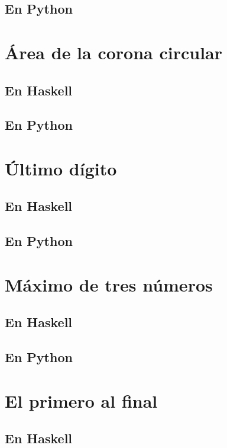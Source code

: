 \documentclass[a4paper,12pt,twoside]{book}
\begin{document}
\subsection*{En Python}

\section{Área de la corona circular}
\subsection*{En Haskell}
\subsection*{En Python}

\section{Último dígito}
\subsection*{En Haskell}
\subsection*{En Python}

\section{Máximo de tres números}
\subsection*{En Haskell}
\subsection*{En Python}

\section{El primero al final}
\subsection*{En Haskell}
\end{document}
